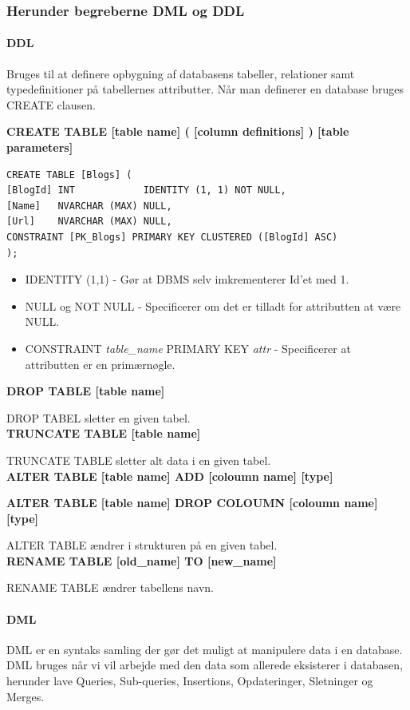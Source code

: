 \subsubsection{Herunder begreberne DML og DDL}

\paragraph{DDL}
Bruges til at definere opbygning af databasens tabeller, relationer samt typedefinitioner på tabellernes attributter. Når man definerer en database bruges CREATE clausen.

\textbf{CREATE TABLE [table name] ( [column definitions] ) [table parameters]}

\begin{lstlisting}[caption=Eksempel på CREATE]
CREATE TABLE [Blogs] (
[BlogId] INT            IDENTITY (1, 1) NOT NULL,
[Name]   NVARCHAR (MAX) NULL,
[Url]    NVARCHAR (MAX) NULL,
CONSTRAINT [PK_Blogs] PRIMARY KEY CLUSTERED ([BlogId] ASC)
);
\end{lstlisting}

\begin{itemize}
	\item IDENTITY (1,1) - Gør at DBMS selv imkrementerer Id'et med 1.
	\item NULL og NOT NULL - Specificerer om det er tilladt for attributten at være NULL.
	\item CONSTRAINT \textit{table\_name} PRIMARY KEY \textit{attr} - Specificerer at attributten er en primærnøgle.
\end{itemize}

\textbf{DROP TABLE [table name]}

DROP TABEL sletter en given tabel.\\

\textbf{TRUNCATE TABLE [table name]}

TRUNCATE TABLE sletter alt data i en given tabel.\\

\textbf{ALTER TABLE [table name] ADD [coloumn name] [type]}

\textbf{ALTER TABLE [table name] DROP COLOUMN [coloumn name] [type]}

ALTER TABLE ændrer i strukturen på en given tabel.\\

\textbf{RENAME TABLE [old\_name] TO [new\_name]}

RENAME TABLE ændrer tabellens navn.

\paragraph{DML}
DML er en syntaks samling der gør det muligt at manipulere data i en database.
DML bruges når vi vil arbejde med den data som allerede eksisterer i databasen, herunder lave Queries, Sub-queries, Insertions, Opdateringer, Sletninger og Merges.


